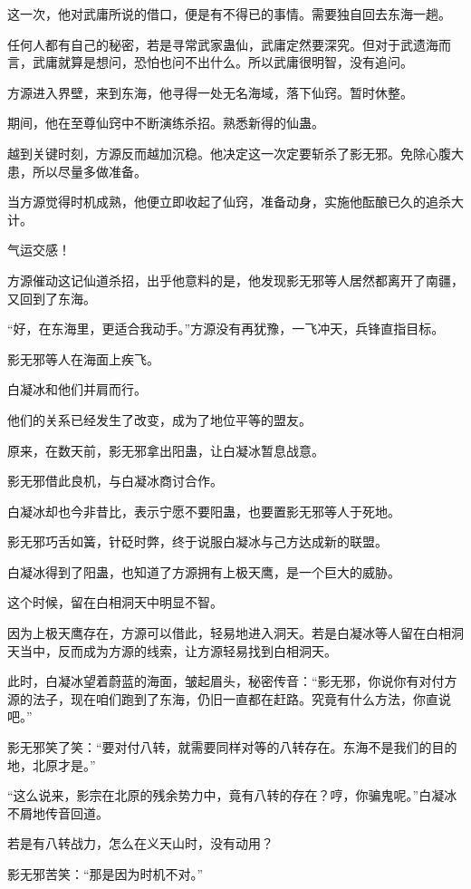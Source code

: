 \begin{this_body}
这一次，他对武庸所说的借口，便是有不得已的事情。需要独自回去东海一趟。

任何人都有自己的秘密，若是寻常武家蛊仙，武庸定然要深究。但对于武遗海而言，武庸就算是想问，恐怕也问不出什么。所以武庸很明智，没有追问。

方源进入界壁，来到东海，他寻得一处无名海域，落下仙窍。暂时休整。

期间，他在至尊仙窍中不断演练杀招。熟悉新得的仙蛊。

越到关键时刻，方源反而越加沉稳。他决定这一次定要斩杀了影无邪。免除心腹大患，所以尽量多做准备。

当方源觉得时机成熟，他便立即收起了仙窍，准备动身，实施他酝酿已久的追杀大计。

气运交感！

方源催动这记仙道杀招，出乎他意料的是，他发现影无邪等人居然都离开了南疆，又回到了东海。

“好，在东海里，更适合我动手。”方源没有再犹豫，一飞冲天，兵锋直指目标。

影无邪等人在海面上疾飞。

白凝冰和他们并肩而行。

他们的关系已经发生了改变，成为了地位平等的盟友。

原来，在数天前，影无邪拿出阳蛊，让白凝冰暂息战意。

影无邪借此良机，与白凝冰商讨合作。

白凝冰却也今非昔比，表示宁愿不要阳蛊，也要置影无邪等人于死地。

影无邪巧舌如簧，针砭时弊，终于说服白凝冰与己方达成新的联盟。

白凝冰得到了阳蛊，也知道了方源拥有上极天鹰，是一个巨大的威胁。

这个时候，留在白相洞天中明显不智。

因为上极天鹰存在，方源可以借此，轻易地进入洞天。若是白凝冰等人留在白相洞天当中，反而成为方源的线索，让方源轻易找到白相洞天。

此时，白凝冰望着蔚蓝的海面，皱起眉头，秘密传音：“影无邪，你说你有对付方源的法子，现在咱们跑到了东海，仍旧一直都在赶路。究竟有什么方法，你直说吧。”

影无邪笑了笑：“要对付八转，就需要同样对等的八转存在。东海不是我们的目的地，北原才是。”

“这么说来，影宗在北原的残余势力中，竟有八转的存在？哼，你骗鬼呢。”白凝冰不屑地传音回道。

若是有八转战力，怎么在义天山时，没有动用？

影无邪苦笑：“那是因为时机不对。”


\end{this_body}
